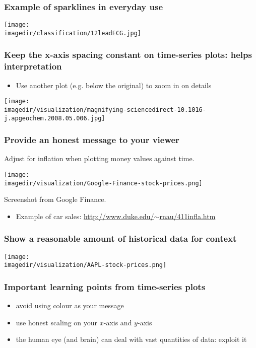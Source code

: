\begin{frame}\frametitle{Example of sparklines in everyday use}
	
	\begin{center}
		\texttt{[image: \\imagedir/classification/12leadECG.jpg]}
	\end{center}
\end{frame}

\begin{frame}\frametitle{Keep the x-axis spacing constant on time-series plots: helps interpretation}
	
	\begin{itemize}
		\item	Use another plot (e.g. below the original) to zoom in on details 
	\end{itemize}

	\centerline{\texttt{[image: \\imagedir/visualization/magnifying-sciencedirect-10.1016-j.apgeochem.2008.05.006.jpg]}}

	\vspace{-14pt}
\end{frame}

\begin{frame}\frametitle{Provide an honest message to your viewer}
	
	Adjust for inflation when plotting money values against time.
	
	\centerline{\texttt{[image: \\imagedir/visualization/Google-Finance-stock-prices.png]}}
	{\scriptsize Screenshot from Google Finance.}
	
	
	\pause
	\vspace{12pt}
	\begin{itemize}
		\item	Example of car sales: \href{http://www.duke.edu/~rnau/411infla.htm}{http://www.duke.edu/$\sim$rnau/411infla.htm} 
	\end{itemize}
	
\end{frame}

\begin{frame}\frametitle{Show a reasonable amount of historical data for context}
	\centerline{\texttt{[image: \\imagedir/visualization/AAPL-stock-prices.png]}}
\end{frame}

\begin{frame}\frametitle{Important learning points from time-series plots}
	
	\begin{itemize}
		\item	avoid using colour as your message
		\item	use honest scaling on your $x$-axis and $y$-axis
		\item	the human eye (and brain) can deal with vast quantities of data: exploit it
	\end{itemize}
	
\end{frame}


